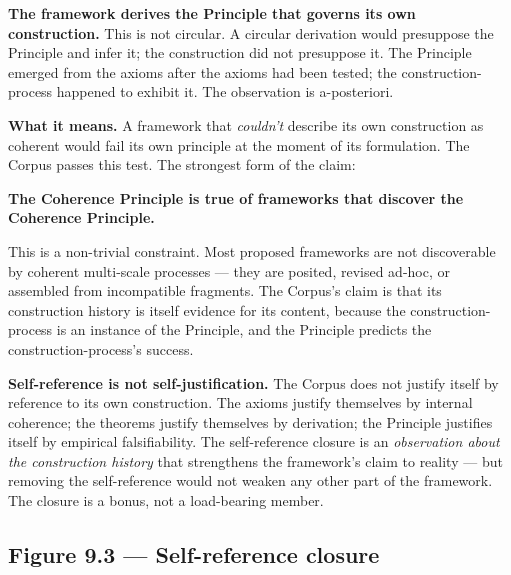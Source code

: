 \documentclass[11pt, openany]{book}
\renewenvironment{quote}{\begin{quoting}}{\end{quoting}}
\begin{document}
\textbf{The framework derives the Principle that governs its own construction.} This is not circular. A circular derivation would presuppose the Principle and infer it; the construction did not presuppose it. The Principle emerged from the axioms after the axioms had been tested; the construction-process happened to exhibit it. The observation is a-posteriori.

\textbf{What it means.} A framework that \textit{couldn't} describe its own construction as coherent would fail its own principle at the moment of its formulation. The Corpus passes this test. The strongest form of the claim:

\begin{quote}
\textbf{The Coherence Principle is true of frameworks that discover the Coherence Principle.}
\end{quote}

This is a non-trivial constraint. Most proposed frameworks are not discoverable by coherent multi-scale processes --- they are posited, revised ad-hoc, or assembled from incompatible fragments. The Corpus's claim is that its construction history is itself evidence for its content, because the construction-process is an instance of the Principle, and the Principle predicts the construction-process's success.

\textbf{Self-reference is not self-justification.} The Corpus does not justify itself by reference to its own construction. The axioms justify themselves by internal coherence; the theorems justify themselves by derivation; the Principle justifies itself by empirical falsifiability. The self-reference closure is an \textit{observation about the construction history} that strengthens the framework's claim to reality --- but removing the self-reference would not weaken any other part of the framework. The closure is a bonus, not a load-bearing member.

\subsection{Figure 9.3 --- Self-reference closure}
\end{document}
